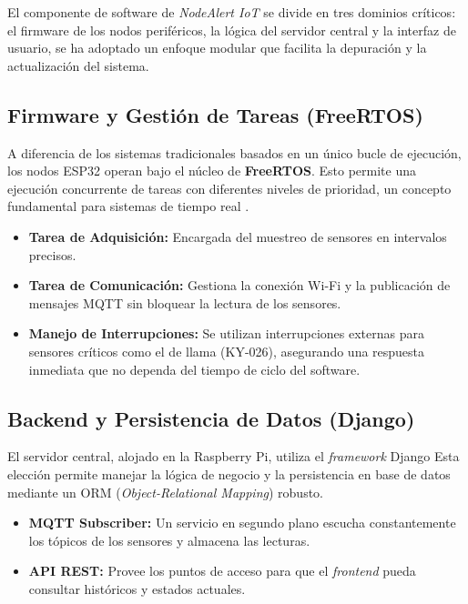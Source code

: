 
El componente de software de \textit{NodeAlert IoT} se divide en tres dominios críticos: el firmware de los nodos periféricos, la lógica del servidor central y la interfaz de usuario, se ha adoptado un enfoque modular que facilita la depuración y la actualización del sistema.

\subsection{Firmware y Gestión de Tareas (FreeRTOS)}
A diferencia de los sistemas tradicionales basados en un único bucle de ejecución, los nodos ESP32 operan bajo el núcleo de \textbf{FreeRTOS}. Esto permite una ejecución concurrente de tareas con diferentes niveles de prioridad, un concepto fundamental para sistemas de tiempo real \citep{valvano2014volume2}.
\begin{itemize}
    \item \textbf{Tarea de Adquisición:} Encargada del muestreo de sensores en intervalos precisos.
    \item \textbf{Tarea de Comunicación:} Gestiona la conexión Wi-Fi y la publicación de mensajes MQTT sin bloquear la lectura de los sensores.
    \item \textbf{Manejo de Interrupciones:} Se utilizan interrupciones externas para sensores críticos como el de llama (KY-026), asegurando una respuesta inmediata que no dependa del tiempo de ciclo del software.
\end{itemize}

\subsection{Backend y Persistencia de Datos (Django)}
El servidor central, alojado en la Raspberry Pi, utiliza el \textit{framework} Django Esta elección permite manejar la lógica de negocio y la persistencia en base de datos mediante un ORM (\textit{Object-Relational Mapping}) robusto. 
\begin{itemize}
    \item \textbf{MQTT Subscriber:} Un servicio en segundo plano escucha constantemente los tópicos de los sensores y almacena las lecturas.
    \item \textbf{API REST:} Provee los puntos de acceso para que el \textit{frontend} pueda consultar históricos y estados actuales.
\end{itemize}

